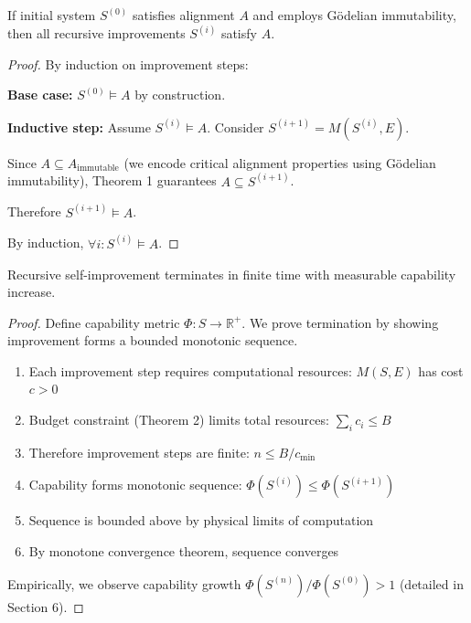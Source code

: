 \documentclass[11pt,letterpaper]{article}
\begin{document}
\begin{theorem}
If initial system $S^{(0)}$ satisfies alignment $A$ and employs Gödelian immutability, then all recursive improvements $S^{(i)}$ satisfy $A$.
\end{theorem}

\begin{proof}
By induction on improvement steps:

\textbf{Base case:} $S^{(0)} \models A$ by construction.

\textbf{Inductive step:} Assume $S^{(i)} \models A$. Consider $S^{(i+1)} = M(S^{(i)}, E)$.

Since $A \subseteq A_{\text{immutable}}$ (we encode critical alignment properties using Gödelian immutability), Theorem 1 guarantees $A \subseteq S^{(i+1)}$.

Therefore $S^{(i+1)} \models A$.

By induction, $\forall i: S^{(i)} \models A$.
\end{proof}

\begin{theorem}
Recursive self-improvement terminates in finite time with measurable capability increase.
\end{theorem}

\begin{proof}
Define capability metric $\Phi: S \rightarrow \mathbb{R}^+$. We prove termination by showing improvement forms a bounded monotonic sequence.

\begin{enumerate}
\item Each improvement step requires computational resources: $M(S, E)$ has cost $c > 0$
\item Budget constraint (Theorem 2) limits total resources: $\sum_i c_i \leq B$
\item Therefore improvement steps are finite: $n \leq B/c_{\text{min}}$
\item Capability forms monotonic sequence: $\Phi(S^{(i)}) \leq \Phi(S^{(i+1)})$
\item Sequence is bounded above by physical limits of computation
\item By monotone convergence theorem, sequence converges
\end{enumerate}

Empirically, we observe capability growth $\Phi(S^{(n)})/\Phi(S^{(0)}) > 1$ (detailed in Section 6).
\end{proof}
\end{document}

